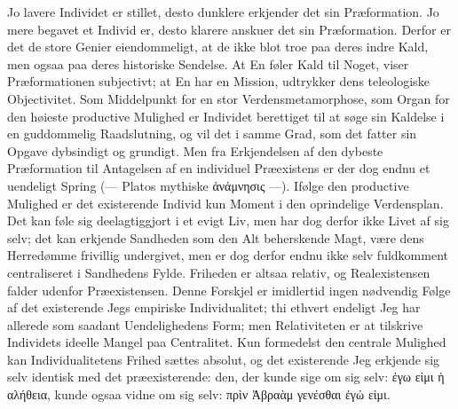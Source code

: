 \documentclass[12pt]{book}
\newcommand{\divrule}{\begin{center}%
  \rule{0.27\linewidth}{0.9pt}\\[1.6pt]\rule{0.22\linewidth}{0.4pt}\end{center}}
\newcommand{\secrule}{\begin{center}%
  \rule{0.20\linewidth}{0.4pt}\\[1.3pt]\rule{0.20\linewidth}{0.4pt}\end{center}}
\newcommand{\opage}[1]{\marginnote{\footnotesize\textit{[#1]}}}
\begin{document}
Jo lavere Individet er stillet, desto dunklere erkjender det sin Præformation. Jo mere
begavet et Individ er, desto klarere anskuer det sin Præformation. Derfor er det de store
Genier eiendommeligt, at de ikke blot troe paa deres indre Kald, men ogsaa paa deres
historiske Sendelse. At En føler Kald til Noget, viser Præformationen subjectivt; at En
har en Mission, udtrykker dens teleologiske Objectivitet. Som Middelpunkt for en stor
Verdensmetamorphose, som Organ for den høieste productive Mulighed er Individet
berettiget til at søge sin Kaldelse i en guddommelig Raadslutning, og vil det i samme
Grad, som det fatter sin Opgave dybsindigt og
\opage{258} %
grundigt. Men fra Erkjendelsen af den dybeste Præformation til Antagelsen af en
individuel Præexistens er der dog endnu et uendeligt Spring (--- Platos mythiske
ἀνάμνησις ---). Ifølge den productive Mulighed er det existerende Individ kun Moment i
den oprindelige Verdensplan. Det kan føle sig deelagtiggjort i et evigt Liv, men har dog
derfor ikke Livet af sig selv; det kan erkjende Sandheden som den Alt beherskende Magt,
være dens Herredømme frivillig undergivet, men er dog derfor endnu ikke selv fuldkomment
centraliseret i Sandhedens Fylde. Friheden er altsaa relativ, og Realexistensen falder
udenfor Præexistensen. Denne Forskjel er imidlertid ingen nødvendig Følge af det
existerende Jegs empiriske Individualitet; thi ethvert endeligt Jeg har allerede som
saadant Uendelighedens Form; men Relativiteten er at tilskrive Individets ideelle Mangel
paa Centralitet. Kun formedelst den centrale Mulighed kan Individualitetens Frihed sættes
absolut, og det existerende Jeg erkjende sig selv identisk med det præexisterende: den,
der kunde sige om sig selv: ἐγω εἰμι ἡ αλήθεια, kunde ogsaa vidne om sig selv: πρὶν
Ἀβραὰμ γενέσθαι ἐγώ εἰμι.
\end{document}

